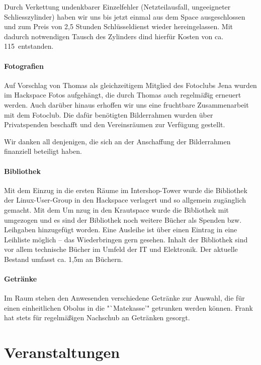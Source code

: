 \documentclass[10pt,DIV16]{scrartcl}
\begin{document}
\label{sec:tueroeffnung}
Durch Verkettung undenkbarer Einzelfehler (Netzteilausfall, 
ungeeigneter Schliesszylinder) haben wir uns bis jetzt einmal aus 
dem Space ausgeschlossen und zum Preis von 2,5 Stunden 
Schlüsseldienst wieder hereingelassen. Mit dadurch notwendigen 
Tausch des Zylinders dind hierfür Kosten von ca. 115\EUR\ entstanden. 

\paragraph{Fotografien}

Auf Vorschlag von Thomas als gleichzeitigem Mitglied des Fotoclubs 
Jena wurden im Hackspace Fotos aufgehängt, die durch Thomas auch 
regelmäßig erneuert werden.  Auch darüber hinaus erhoffen wir uns 
eine fruchtbare Zusammenarbeit mit dem Fotoclub. Die dafür 
benötigten Bilderrahmen wurden über Privatspenden beschafft und den 
Vereinsräumen zur Verfügung gestellt.

Wir danken all denjenigen, die sich an der Anschaffung der Bilderrahmen
finanziell beteiligt haben.

\paragraph{Bibliothek}

Mit dem Einzug in die ersten Räume im Intershop-Tower wurde die 
Bibliothek der Linux-User-Group in den Hackspace verlagert und so 
allgemein zugänglich gemacht. Mit dem Um nzug in den Krautspace 
wurde die Bibliothek mit umgezogen und es sind der Bibliothek noch 
weitere Bücher als Spenden bzw. Leihgaben hinzugefügt worden. Eine 
Ausleihe ist über einen Eintrag in eine Leihliste möglich -- das 
Wiederbringen gern gesehen. Inhalt der Bibliothek sind vor allem 
technische Bücher im Umfeld der IT und Elektronik. Der aktuelle 
Bestand umfasst ca. 1,5m an Büchern. 

\paragraph{Getränke}
\label{sec:getraenke}

Im Raum stehen den Anwesenden verschiedene Getränke zur Auswahl, die 
für einen einheitlichen Obolus in die "`Matekasse'" getrunken werden 
können. Frank hat stets für regelmäßigen Nachschub an Getränken 
gesorgt.

\section{Veranstaltungen}
\end{document}
